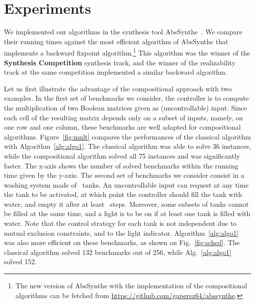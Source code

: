 \documentclass[submission,copyright,creativecommons]{eptcs}
\begin{document}
\section{Experiments}\label{sec:experiments}
We implemented our algorithms in the synthesis tool AbsSynthe~\cite{bprs14}. We
compare their running times against the most efficient algorithm of AbsSynthe
that implements a backward fixpoint algorithm.\footnote{The new version of
	AbsSynthe with the implementation of the compositional algorithms can be
	fetched from \url{https://github.com/gaperez64/abssynthe}.}
This algorithm was the winner of the \textbf{ Synthesis Competition}
synthesis track, and the winner of the realizability track at the same
competition implemented a similar backward algorithm.

Let us first illustrate the advantage of the compositional approach
with two examples. In the first set of benchmarks we consider, the controller is to
compute the multiplication of two Boolean matrices given as (uncontrollable) input.
Since each cell of the resulting matrix
depends only on a subset of inputs, namely, on one row and one column, these
benchmarks are well adapted for compositional algorithms. 
Figure~\ref{fig:mult} compares the performances of the classical algorithm with
Algorithm~\ref{alg:algo1}. The classical algorithm was able to solve 36 instances,
while the compositional algorithm solved all 75 instances and was significantly
faster.
The x-axis shows the number of solved benchmarks
within the running time given by the y-axis.  
The second set of benchmarks we consider consist in a washing system made of~
tanks. An uncontrollable input can request at any time the tank to be activated,
at which point the controller should fill the tank with water, and empty it 
after at least~ steps. Moreover, some subsets of tanks cannot be filled at
the same time, and a light is to be on if at least one tank is filled with water.
Note that the control strategy for each tank is not independent due to mutual
exclusion constraints, and to the light indicator.
Algorithm~\ref{alg:algo1} was also more efficient on these benchmarks, as shown
on Fig.~\ref{fig:sched}. The classical algorithm solved 132 benchmarks out of 256, 
while Alg.~\ref{alg:algo1} solved 152.
\end{document}
